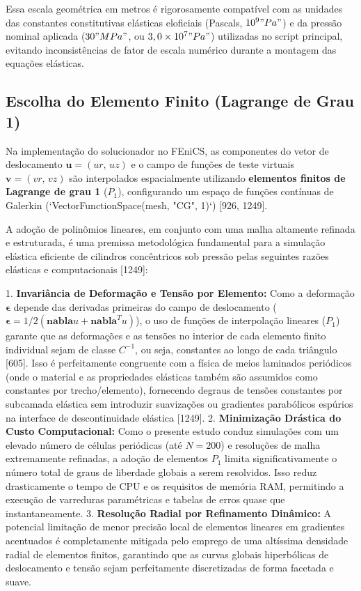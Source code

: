 Essa escala geométrica em metros é rigorosamente compatível com as unidades das constantes constitutivas elásticas eloficiais (Pascals, $10^9 "Pa"$) e da pressão nominal aplicada ($30 "MPa"$, ou $3,0 \times 10^7 "Pa"$) utilizadas no script principal, evitando inconsistências de fator de escala numérico durante a montagem das equações elásticas.

\subsection{Escolha do Elemento Finito (Lagrange de Grau 1)}

Na implementação do solucionador no FEniCS, as componentes do vetor de deslocamento $\mathbf{u} = (u\textit{r, u}z)$ e o campo de funções de teste virtuais $\mathbf{v} = (v\textit{r, v}z)$ são interpolados espacialmente utilizando \textbf{elementos finitos de Lagrange de grau 1} ($P_1$), configurando um espaço de funções contínuas de Galerkin (`VectorFunctionSpace(mesh, "CG", 1)`) [926, 1249].

A adoção de polinômios lineares, em conjunto com uma malha altamente refinada e estruturada, é uma premissa metodológica fundamental para a simulação elástica eficiente de cilindros concêntricos sob pressão pelas seguintes razões elásticas e computacionais [1249]:

1. \textbf{Invariância de Deformação e Tensão por Elemento:} Como a deformação $\mathbf{\epsilon}$ depende das derivadas primeiras do campo de deslocamento ($\mathbf{\epsilon} = 1/2(\mathbf{nabla} u + \mathbf{nabla}^T u)$), o uso de funções de interpolação lineares ($P_1$) garante que as deformações e as tensões no interior de cada elemento finito individual sejam de classe $C^{-1}$, ou seja, constantes ao longo de cada triângulo [605]. Isso é perfeitamente congruente com a física de meios laminados periódicos (onde o material e as propriedades elásticas também são assumidos como constantes por trecho/elemento), fornecendo degraus de tensões constantes por subcamada elástica sem introduzir suavizações ou gradientes parabólicos espúrios na interface de descontinuidade elástica [1249].
2. \textbf{Minimização Drástica do Custo Computacional:} Como o presente estudo conduz simulações com um elevado número de células periódicas (até $N = 200$) e resoluções de malha extremamente refinadas, a adoção de elementos $P_1$ limita significativamente o número total de graus de liberdade globais a serem resolvidos. Isso reduz drasticamente o tempo de CPU e os requisitos de memória RAM, permitindo a execução de varreduras paramétricas e tabelas de erros quase que instantaneamente.
3. \textbf{Resolução Radial por Refinamento Dinâmico:} A potencial limitação de menor precisão local de elementos lineares em gradientes acentuados é completamente mitigada pelo emprego de uma altíssima densidade radial de elementos finitos, garantindo que as curvas globais hiperbólicas de deslocamento e tensão sejam perfeitamente discretizadas de forma facetada e suave.

